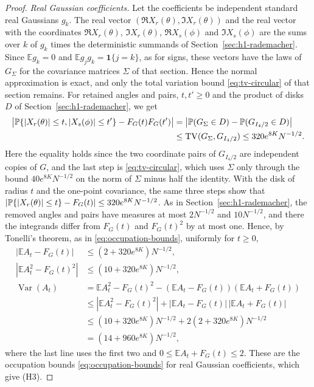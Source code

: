 \begin{proof}
\medskip
\noindent\emph{Real Gaussian coefficients.}
Let the coefficients be independent standard real Gaussians $g_k$.
The real vector $(\Re X_r(\theta),\Im X_r(\theta))$ and the
real vector with the coordinates $\Re X_r(\theta)$, $\Im X_r(\theta)$,
$\Re X_s(\phi)$ and $\Im X_s(\phi)$ are the
sums over $k$ of $g_k$ times the deterministic summands of
Section~\ref{sec:h1-rademacher}. Since $\mathbb Eg_k=0$ and
$\mathbb Eg_jg_k=\mathbf 1\{j=k\}$, as for signs, these vectors have the
laws of $G_\Sigma$ for the covariance matrices $\Sigma$ of that
section.
Hence the normal approximation is exact, and only the total variation
bound \eqref{eq:tv-circular} of that section remains.
For retained angles and pairs, $t,t'\ge0$ and the product of disks $D$
of Section~\ref{sec:h1-rademacher}, we get
\begin{equation}
 \begin{aligned}
 \bigl|\mathbb P\{|X_r(\theta)|\le t,|X_s(\phi)|\le t'\}-F_G(t)F_G(t')\bigr|
 &=\bigl|\mathbb P(G_\Sigma\in D)-\mathbb P(G_{I_4/2}\in D)\bigr|\\
 &\le\operatorname{TV}(G_\Sigma,G_{I_4/2})
 \le320e^{8K}N^{-1/2}.
 \end{aligned}\label{eq:gaussian-point-bounds}
\end{equation}
Here the equality holds since the two coordinate pairs of $G_{I_4/2}$
are independent copies of $G$, and the last step is
\eqref{eq:tv-circular}, which uses $\Sigma$ only through the
bound $40e^{8K}N^{-1/2}$ on the norm of $\Sigma$ minus half the identity.
With the disk of radius $t$ and the one-point covariance, the same three
steps show that
$|\mathbb P\{|X_r(\theta)|\le t\}-F_G(t)|\le320e^{8K}N^{-1/2}$.
As in Section~\ref{sec:h1-rademacher}, the removed angles and pairs have
measures at most $2N^{-1/2}$ and $10N^{-1/2}$, and there the integrands
differ from $F_G(t)$ and $F_G(t)^2$ by at most one.
Hence, by Tonelli's theorem, as in \eqref{eq:occupation-bounds},
uniformly for $t\ge0$,
\begin{align*}
 |\mathbb EA_t-F_G(t)|&\le(2+320e^{8K})N^{-1/2},\\
 |\mathbb EA_t^2-F_G(t)^2|&\le(10+320e^{8K})N^{-1/2},\\
 \operatorname{Var}(A_t)
 &=\mathbb EA_t^2-F_G(t)^2-(\mathbb EA_t-F_G(t))(\mathbb EA_t+F_G(t))\\
 &\le|\mathbb EA_t^2-F_G(t)^2|
       +|\mathbb EA_t-F_G(t)|\,|\mathbb EA_t+F_G(t)|\\
 &\le(10+320e^{8K})N^{-1/2}+2(2+320e^{8K})N^{-1/2}\\
 &=(14+960e^{8K})N^{-1/2},
\end{align*}
where the last line uses the first two and
$0\le\mathbb EA_t+F_G(t)\le2$.
These are the occupation bounds \eqref{eq:occupation-bounds} for real
Gaussian coefficients, which give (H3).


\end{proof}
